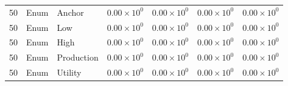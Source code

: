 \begin{longtable}{rllrrrr}
50 & Enum & Anchor & $0.00\times10^{0}$ & $0.00\times10^{0}$ & $0.00\times10^{0}$ & $0.00\times10^{0}$\\
50 & Enum & Low & $0.00\times10^{0}$ & $0.00\times10^{0}$ & $0.00\times10^{0}$ & $0.00\times10^{0}$\\
50 & Enum & High & $0.00\times10^{0}$ & $0.00\times10^{0}$ & $0.00\times10^{0}$ & $0.00\times10^{0}$\\
50 & Enum & Production & $0.00\times10^{0}$ & $0.00\times10^{0}$ & $0.00\times10^{0}$ & $0.00\times10^{0}$\\
50 & Enum & Utility & $0.00\times10^{0}$ & $0.00\times10^{0}$ & $0.00\times10^{0}$ & $0.00\times10^{0}$\\
\end{longtable}\normalsize
